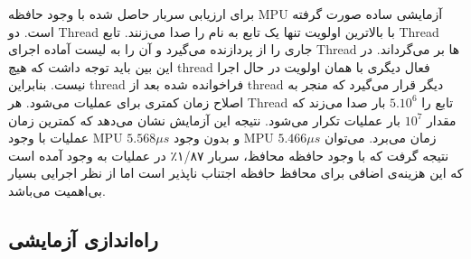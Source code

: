 \documentclass[10pt, a4paper]{article}
\begin{document}
برای ارزیابی سربار حاصل شده با وجود حافظه MPU آزمایشی ساده صورت گرفته است. دو
Thread با بالاترین اولویت تنها یک تابع به نام  را صدا
می‌زنند. تابع  Thread جاری را از پردازنده می‌گیرد و آن را به
لیست آماده اجرای Thread ها بر می‌گرداند. در این بین باید توجه داشت که هیچ thread
فعال دیگری با همان اولویت در حال اجرا نیست.  بنابراین thread فراخوانده شده بعد
از thread دیگر قرار می‌گیرد که منجر به اصلاح زمان کمتری برای عملیات  می‌شود. هر Thread تابع  را $5.10^6$ بار صدا می‌زند
که مقدار $10^7$ بار عملیات  تکرار می‌شود. نتیجه این آزمایش
نشان می‌دهد که کمترین زمان عملیات  با وجود MPU $5.568\mu s$ و
بدون وجود MPU $5.466\mu s$ زمان می‌برد. می‌توان نتیجه گرفت که با وجود حافظه محافظ،
سربار ۱/۸۷٪ در عملیات  به وجود آمده است که این هزینه‌ی
اضافی برای محافظ حافظه اجتناب ناپذیر است اما از نظر اجرایی بسیار بی‌اهمیت
می‌باشد.


\subsection{راه‌اندازی آزمایشی}




\end{document}
